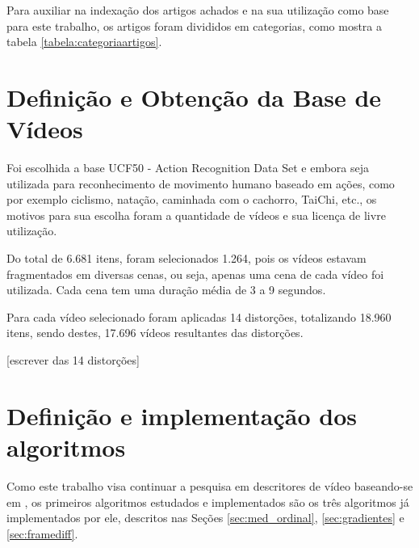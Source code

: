 Para auxiliar na indexação dos artigos achados e na sua utilização como base para este trabalho, os artigos foram divididos em categorias, como mostra a tabela \ref{tabela:categoriaartigos}.

\begin{table}[h]
    \caption{Categorização dos artigos.}
    \label{tabela:categoriaartigos}
\end{table}

\section{Definição e Obtenção da Base de Vídeos}

Foi escolhida a base UCF50 - Action Recognition Data Set \cite{reddy2013recognizing} e embora seja utilizada para reconhecimento de movimento humano baseado em ações, como por exemplo ciclismo, natação, caminhada com o cachorro, TaiChi, etc., os motivos para sua escolha foram a quantidade de vídeos e sua licença de livre utilização. 

Do total de 6.681 itens, foram selecionados 1.264, pois os vídeos estavam fragmentados em diversas cenas, ou seja, apenas uma cena de cada vídeo foi utilizada. Cada cena tem uma duração média de 3 a 9 segundos.

Para cada vídeo selecionado foram aplicadas 14 distorções, totalizando 18.960 itens, sendo destes, 17.696 vídeos resultantes das distorções.

[escrever das 14 distorções]

\section{Definição e implementação dos algoritmos}

Como este trabalho visa continuar a pesquisa em descritores de vídeo baseando-se em \cite{sylvio2015}, os primeiros algoritmos estudados e implementados são os três algoritmos já implementados por ele, descritos nas Seções \ref{sec:med_ordinal}, \ref{sec:gradientes} e \ref{sec:framediff}.

